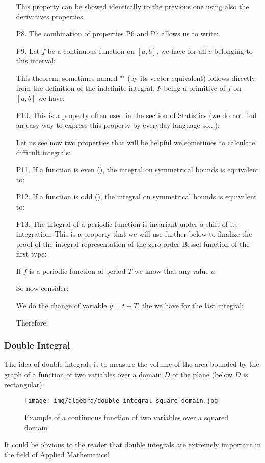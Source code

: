 \begin{enumerate}
		This property can be showed identically to the previous one using also the derivatives properties.
		\item[P8.] The combination of properties P6 and P7 allows us to write:
		
		\item[P9.] Let $f$ be a continuous function on $[a, b]$, we have for all $c$ belonging to this interval:
		
		This theorem, sometimes named "" (by its vector equivalent) follows directly from the definition of the indefinite integral. $F$ being a primitive of $f$ on $[a, b]$ we have:
		
		\item[P10.] This is a property often used in the section of Statistics (we do not find an easy way to express this property by everyday language so...):
		
		 Let us see now two properties that will be helpful we sometimes to calculate difficult integrals:
		\item[P11.] If a function is even (), the integral on symmetrical bounds is equivalent to:
		
		\item[P12.] If a function is odd (), the integral on symmetrical bounds is equivalent to:
		
		
		\item[P13.] The integral of a periodic function is invariant under a shift of its integration. This is a property that we will use further below to finalize the proof of the integral representation of the zero order Bessel function of the first type:
	
		If $f$ is a periodic function of period $T$ we know that any value $a$:
		
		So now consider:
		
		We do the change of variable $y=t-T$, the we have for the last integral:
		
		Therefore:
		
	\end{enumerate}
	
	\pagebreak
	\subsubsection{Double Integral}
	The idea of double integrals is to measure the volume of the area bounded by the graph of a function of two variables over a domain $D$ of the plane (below $D$ is rectangular):
	\begin{figure}[H]
		\centering
		\texttt{[image: img/algebra/double\_integral\_square\_domain.jpg]}
		\caption{Example of a continuous function of two variables over a squared domain}
	\end{figure}
	It could be obvious to the reader that double integrals are extremely important in the field of Applied Mathematics!
	
